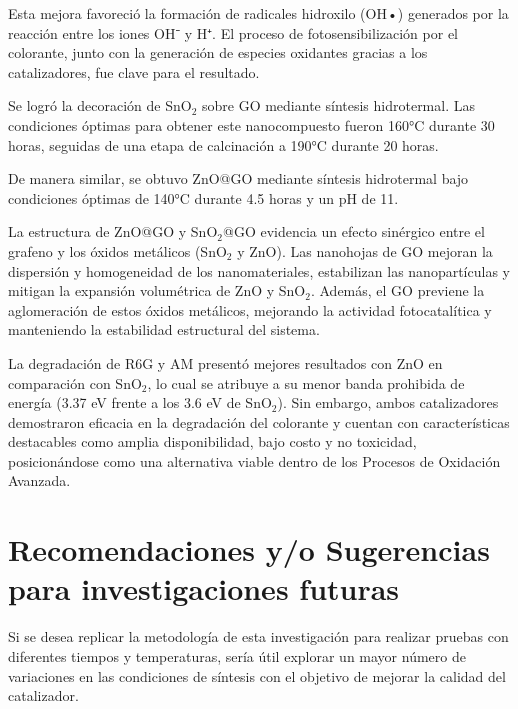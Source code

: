 \documentclass[12pt]{article}
\begin{document}
Esta mejora favoreció la formación de radicales hidroxilo (OH•) generados por la reacción entre los iones OH⁻ y H⁺. El proceso de fotosensibilización por el colorante, junto con la generación de especies oxidantes gracias a los catalizadores, fue clave para el resultado.\vspace{1em} %

Se logró la decoración de SnO$\displaystyle _{2}$ sobre GO mediante síntesis hidrotermal. Las condiciones óptimas para obtener este nanocompuesto fueron 160°C durante 30 horas, seguidas de una etapa de calcinación a 190°C durante 20 horas.\vspace{1em} %

De manera similar, se obtuvo ZnO@GO mediante síntesis hidrotermal bajo condiciones óptimas de 140°C durante 4.5 horas y un pH de 11.\vspace{1em} %

La estructura de ZnO@GO y SnO$\displaystyle _{2}$@GO evidencia un efecto sinérgico entre el grafeno y los óxidos metálicos (SnO$\displaystyle _{2}$ y ZnO). Las nanohojas de GO mejoran la dispersión y homogeneidad de los nanomateriales, estabilizan las nanopartículas y mitigan la expansión volumétrica de ZnO y SnO$\displaystyle _{2}$. Además, el GO previene la aglomeración de estos óxidos metálicos, mejorando la actividad fotocatalítica y manteniendo la estabilidad estructural del sistema.\vspace{1em} %

La degradación de R6G y AM presentó mejores resultados con ZnO en comparación con SnO$\displaystyle _{2}$, lo cual se atribuye a su menor banda prohibida de energía (3.37 eV frente a los 3.6 eV de SnO$\displaystyle _{2}$). Sin embargo, ambos catalizadores demostraron eficacia en la degradación del colorante y cuentan con características destacables como amplia disponibilidad, bajo costo y no toxicidad, posicionándose como una alternativa viable dentro de los Procesos de Oxidación Avanzada.


\newpage
\section*{Recomendaciones y/o Sugerencias para investigaciones futuras}

Si se desea replicar la metodología de esta investigación para realizar pruebas con diferentes tiempos y temperaturas, sería útil explorar un mayor número de variaciones en las condiciones de síntesis con el objetivo de mejorar la calidad del catalizador.\vspace{1em} %
\end{document}

